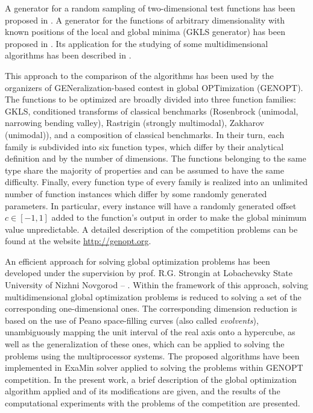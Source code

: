 \documentclass{llncs}
\begin{document}
A generator for a random sampling of two-dimensional test functions has been proposed in \cite{Grishagin1978}. A generator for the functions of arbitrary dimensionality with known positions of the local and global minima (GKLS generator) has been proposed in \cite{Gaviano}. Its application for the studying of some multidimensional algorithms has been described in \cite{Kvasov2003,Sergeyev2013}.

This approach to the comparison of the algorithms has been used by the organizers of GENeralization-based contest in global OPTimization (GENOPT). The functions to be optimized are broadly divided into three function families: GKLS, conditioned transforms of classical benchmarks (Rosenbrock (unimodal, narrowing bending valley), Rastrigin (strongly multimodal), Zakharov (unimodal)), and a composition of classical benchmarks. In their turn, each family is subdivided into six function types, which differ by their analytical definition and by the number of dimensions. The functions belonging to the same type share the majority of properties and can be assumed to have the same difficulty. Finally, every function type of every family is realized into an unlimited number of function instances which differ by some randomly generated parameters. In particular, every instance will have a randomly generated offset $c\in[-1,1]$ added to the function’s output in order to make the global minimum value unpredictable. A detailed description of the competition problems can be found at the website \url{http://genopt.org}.

An efficient approach for solving global optimization problems has been developed under the supervision by prof. R.G. Strongin at Lobachevsky State University of Nizhni Novgorod \cite{Sergeyev1994} -- \cite{Barkalov2016}. Within the framework of this approach, solving multidimensional global optimization problems is reduced to solving a set of the corresponding one-dimensional ones. The corresponding dimension reduction is based on the use of Peano space-filling curves (also called \textit{evolvents}), unambiguously mapping the unit interval of the real axis onto a hypercube, as well as the generalization of these ones, which can be applied to solving the problems using the multiprocessor systems. The proposed algorithms have been implemented in ExaMin solver applied to solving the problems within GENOPT competition. In the present work, a brief description of the global optimization algorithm applied and of its modifications are given, and the results of the computational experiments with the problems of the competition are presented.
\end{document}
